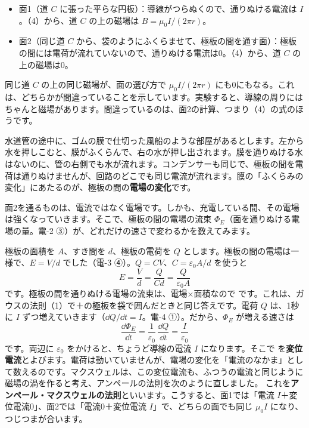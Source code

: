 \begin{itemize}[leftmargin=1.4\zw, itemsep=1pt, topsep=2pt, label={\color{bkTheme}●}]
\item 面1（道 $C$ に張った平らな円板）：導線がつらぬくので、通りぬける電流は $I$。（4）から、道 $C$ の上の磁場は $B=\mu_0I/(2\pi r)$。
\item 面2（同じ道 $C$ から、袋のようにふくらませて、極板の間を通す面）：極板の間には電荷が流れていないので、通りぬける電流は0。（4）から、道 $C$ の上の磁場は0。
\end{itemize}

同じ道 $C$ の上の同じ磁場が、面の選び方で $\mu_0I/(2\pi r)$ にも0にもなる。これは、どちらかが間違っていることを示しています。実験すると、導線の周りにはちゃんと磁場があります。間違っているのは、面2の計算、つまり（4）の式のほうです。

\begin{phmijika}[水道管で考える]
水道管の途中に、ゴムの膜で仕切った風船のような部屋があるとします。左から水を押しこむと、膜がふくらんで、右の水が押し出されます。膜を通りぬける水はないのに、管の右側でも水が流れます。コンデンサーも同じで、極板の間を電荷は通りぬけませんが、回路のどこでも同じ電流が流れます。膜の「ふくらみの変化」にあたるのが、極板の間の\textbf{電場の変化}です。
\end{phmijika}



\leavevmode\label{ph:電-14:sec3}面2を通るものは、電流ではなく電場です。しかも、充電している間、その電場は強くなっていきます。そこで、極板の間の電場の流束 $\Phi_E$（面を通りぬける電場の量。電-2 ③）が、どれだけの速さで変わるかを数えてみます。

極板の面積を $A$、すき間を $d$、極板の電荷を $Q$ とします。極板の間の電場は一様で、$E=V/d$ でした（電-3 ④）。$Q=CV$、$C=\varepsilon_0A/d$ を使うと
\[ E=\frac{V}{d}=\frac{Q}{Cd}=\frac{Q}{\varepsilon_0A} \]
です。極板の間を通りぬける電場の流束は、電場×面積なので
です。これは、ガウスの法則（1）で＋の極板を袋で囲んだときと同じ答えです。電荷 $Q$ は、1秒に $I$ ずつ増えていきます（$\dd Q/\dd t=I$。電-4 ①）。だから、$\Phi_E$ が増える速さは
\[ \frac{\dd\Phi_E}{\dd t}=\frac{1}{\varepsilon_0}\,\frac{\dd Q}{\dd t}=\frac{I}{\varepsilon_0} \]
です。両辺に $\varepsilon_0$ をかけると、ちょうど導線の電流 $I$ になります。そこで
\label{ph:電-14:hen}を\textbf{変位電流}とよびます。電荷は動いていませんが、電場の変化を「電流のなかま」として数えるのです。マクスウェルは、この変位電流も、ふつうの電流と同じように磁場の渦を作ると考え、アンペールの法則を次のように直しました。
\label{ph:電-14:amp-max}これを\textbf{アンペール・マクスウェルの法則}といいます。こうすると、面1では「電流 $I$＋変位電流0」、面2では「電流0＋変位電流 $I$」で、どちらの面でも同じ $\mu_0I$ になり、つじつまが合います。


